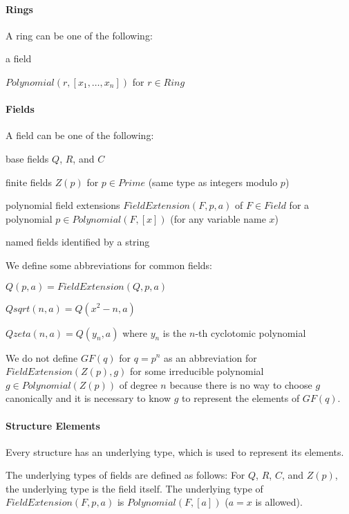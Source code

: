 \paragraph{Rings}
A ring can be one of the following:
\begin{compactitem}
 \item a field
 \item $Polynomial(r,[x_1,\ldots,x_n])$ for $r\in Ring$
\end{compactitem}

\paragraph{Fields}
A field can be one of the following:
\begin{compactitem}
 \item base fields $Q$, $R$, and $C$
 \item finite fields $Z(p)$ for $p\in Prime$ (same type as integers modulo $p$)
 \item polynomial field extensions $FieldExtension(F,p,a)$ of $F\in Field$ for a polynomial $p\in Polynomial(F,[x])$ (for any variable name $x$)
 \item named fields identified by a string
\end{compactitem}

We define some abbreviations for common fields:
\begin{compactitem}
 \item $Q(p,a)=FieldExtension(Q,p,a)$
 \item $Qsqrt(n,a)=Q(x^2-n,a)$
 \item $Qzeta(n,a)=Q(y_n,a)$ where $y_n$ is the $n$-th cyclotomic polynomial
\end{compactitem}

We do not define $GF(q)$ for $q=p^n$ as an abbreviation for $FieldExtension(Z(p),g)$ for some irreducible polynomial $g\in Polynomial(Z(p))$ of degree $n$ because there is no way to choose $g$ canonically and it is necessary to know $g$ to represent the elements of $GF(q)$.

\paragraph{Structure Elements}
Every structure has an underlying type, which is used to represent its elements.

The underlying types of fields are defined as follows:
For $Q$, $R$, $C$, and $Z(p)$, the underlying type is the field itself.
The underlying type of $FieldExtension(F,p,a)$ is $Polynomial(F,[a])$ ($a=x$ is allowed).
